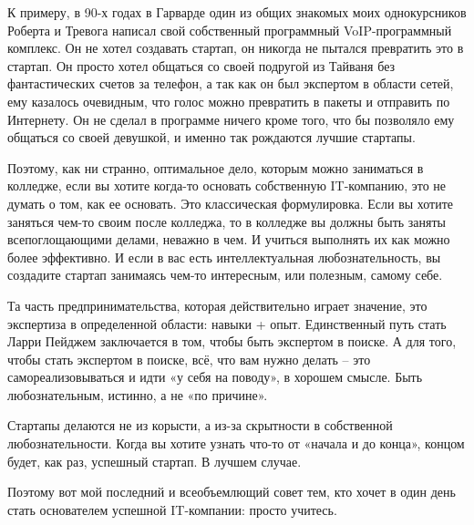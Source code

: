 \documentclass[ebook,12pt,oneside,openany]{memoir}
\begin{document}
К примеру, в 90-х годах в Гарварде один из общих знакомых моих
однокурсников Роберта и Тревога написал свой собственный программный
VoIP-программный комплекс. Он не хотел создавать стартап, он никогда
не пытался превратить это в стартап. Он просто хотел общаться со своей
подругой из Тайваня без фантастических счетов за телефон, а так как он
был экспертом в области сетей, ему казалось очевидным, что голос можно
превратить в пакеты и отправить по Интернету. Он не сделал в программе
ничего кроме того, что бы позволяло ему общаться со своей девушкой, и
именно так рождаются лучшие стартапы.

Поэтому, как ни странно, оптимальное дело, которым можно заниматься в
колледже, если вы хотите когда-то основать собственную IT-компанию,
это не думать о том, как ее основать. Это классическая формулировка.
Если вы хотите заняться чем-то своим после колледжа, то в колледже вы
должны быть заняты всепоглощающими делами, неважно в чем. И учиться
выполнять их как можно более эффективно. И если в вас есть
интеллектуальная любознательность, вы создадите стартап занимаясь
чем-то интересным, или полезным, самому себе.

Та часть предпринимательства, которая действительно играет значение,
это экспертиза в определенной области: навыки + опыт. Единственный
путь стать Ларри Пейджем заключается в том, чтобы быть экспертом в
поиске. А для того, чтобы стать экспертом в поиске, всё, что вам нужно
делать – это самореализовываться и идти «у себя на поводу», в хорошем
смысле. Быть любознательным, истинно, а не «по причине».

Стартапы делаются не из корысти, а из-за скрытности в собственной
любознательности. Когда вы хотите узнать что-то от «начала и до
конца», концом будет, как раз, успешный стартап. В лучшем случае.

Поэтому вот мой последний и всеобъемлющий совет тем, кто хочет в один
день стать основателем успешной IT-компании: просто учитесь.
\end{document}
